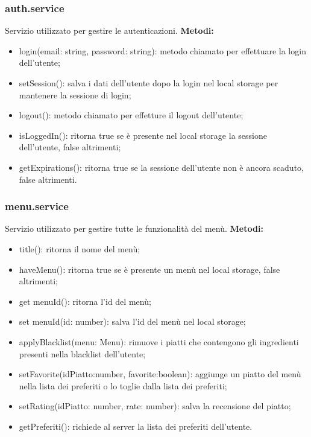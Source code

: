 \subsubsection{auth.service}
Servizio utilizzato per gestire le autenticazioni.
\textbf{Metodi:}
\begin{itemize}
    \item login(email: string, password: string): metodo chiamato per effettuare la login dell'utente;
    \item setSession(): salva i dati dell'utente dopo la login nel local storage per mantenere la sessione di login;
    \item logout(): metodo chiamato per effetture il logout dell'utente;
    \item isLoggedIn(): ritorna true se è presente nel local storage la sessione dell'utente, false altrimenti;
    \item getExpirations(): ritorna true se la sessione dell'utente non è ancora scaduto, false altrimenti.
\end{itemize}

\subsubsection{menu.service}
Servizio utilizzato per gestire tutte le funzionalità del menù.
\textbf{Metodi:}
\begin{itemize}
    \item title(): ritorna il nome del menù;
    \item haveMenu(): ritorna true se è presente un menù nel local storage, false altrimenti;
    \item get menuId(): ritorna l'id del menù;
    \item set menuId(id: number): salva l'id del menù nel local storage;
    \item applyBlacklist(menu: Menu): rimuove i piatti che contengono gli ingredienti presenti nella blacklist dell'utente;
    \item setFavorite(idPiatto:number, favorite:boolean): aggiunge un piatto del menù nella lista dei preferiti o lo toglie dalla lista dei preferiti;
    \item  setRating(idPiatto: number, rate: number): salva la recensione del piatto;
    \item getPreferiti(): richiede al server la lista dei preferiti dell'utente.
\end{itemize}

